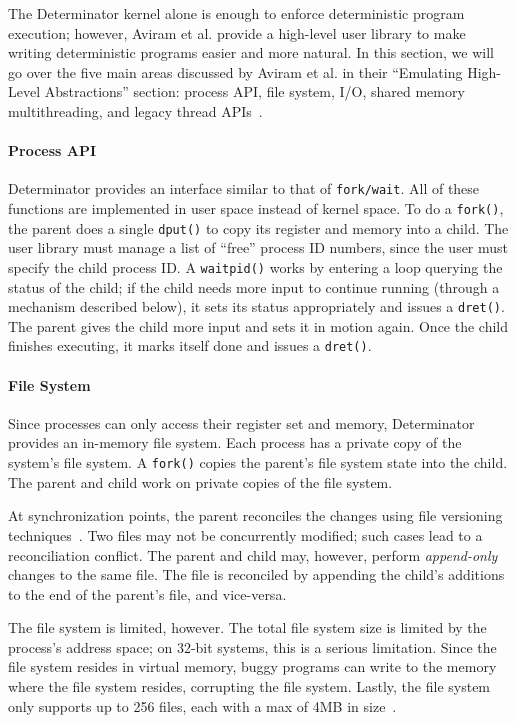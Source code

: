 The Determinator kernel alone is enough to enforce deterministic program
execution; however, Aviram et al. provide a high-level user library to make
writing deterministic programs easier and more natural. In this section, we will
go over
the five main areas discussed by Aviram et al. in their ``Emulating High-Level
Abstractions'' section: process API, file
system, I/O, shared memory multithreading, and legacy thread APIs~\cite{Aviram10}.

\paragraph{Process API}
Determinator provides an interface similar to that of {\tt fork/wait}.
All of these functions are implemented in user space instead of kernel space.
To do a {\tt fork()}, the parent does a single {\tt dput()} to copy its register
and memory into a child. The user library must manage a list of ``free'' process
ID numbers, since the user must specify the child process ID. A {\tt waitpid()}
works by entering a loop querying the status of the child; if the child needs
more input to continue running (through a mechanism described below), it
sets its status appropriately and issues a {\tt dret()}. The parent gives the
child more input and sets it in motion again. Once the child finishes executing,
it marks itself done and issues a {\tt dret()}.

\paragraph{File System}
Since processes can only access their register set and memory, Determinator
provides an in-memory file system. Each process has a private copy of the
system's file system. A {\tt fork()} copies the parent's file system state into
the child. The parent and child work on private copies of the file system.

At synchronization points, the parent reconciles the changes using file
versioning techniques~\cite{parker1983detection}. Two files may not be
concurrently modified; such cases lead to a reconciliation conflict. The parent
and child may, however, perform \emph{append-only} changes to the same file.
The file is reconciled by appending the child's additions to the end of the
parent's file, and vice-versa.

The file system is limited, however. The total file system size is limited
by the process's address space; on 32-bit systems, this is a serious limitation.
Since the file system resides in virtual memory, buggy programs can write to
the memory where the file system resides, corrupting the file system. Lastly,
the file system only supports up to 256 files, each with a max of 4MB in
size~\cite{Aviram10cloud}.

